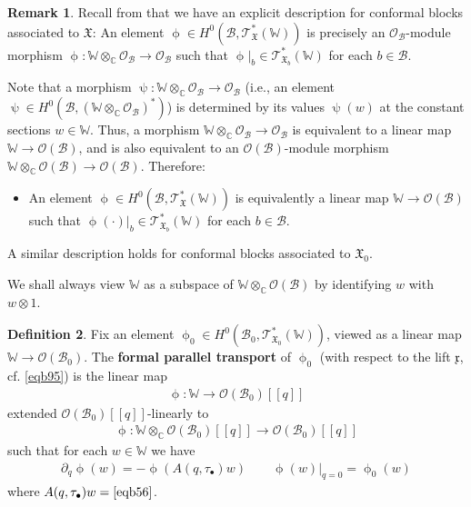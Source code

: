\documentclass[11pt,b5paper,notitlepage]{article}
\theoremstyle{definition}
\newtheorem{df}{Definition}[section]
\newtheorem{rem}[df]{Remark}
\theoremstyle{plain}
\newcommand{\mc}{\mathcal}
\newcommand{\scr}{\mathscr}
\newcommand{\xk}{\mathfrak x}
\newcommand{\blt}{\bullet}
\newcommand{\Wbb}{\mathbb W}
\newcommand{\Cbb}{\mathbb C}
\newcommand{\<}{\left\langle}
\renewcommand{\>}{\right\rangle}
\newcommand{\MB}{\mathcal{B}}
\newcommand{\fx}{\mathfrak{X}}
\newcommand{\ST}{\mathscr{T}}
\numberwithin{equation}{section}
\begin{document}
\begin{rem}\label{lbb27}
Recall from \cite[Prop. 2.21]{GZ1} that we have an explicit description for conformal blocks associated to $\fx$: An element $\upphi\in H^0(\MB,\scr T^*_\fx(\Wbb))$ is precisely an $\mc O_\MB$-module morphism $\upphi:\Wbb\otimes_\Cbb\mc O_\MB\rightarrow\mc O_\MB$ such that $\upphi|_b\in\scr T_{\fx_b}^*(\Wbb)$ for each $b\in\MB$. 

Note that a morphism $\uppsi:\Wbb\otimes_\Cbb\mc O_\MB\rightarrow\mc O_\MB$ (i.e., an element $\uppsi\in H^0(\MB,(\Wbb\otimes_\Cbb\mc O_\MB)^*)$) is determined by its values $\uppsi(w)$ at the constant sections $w\in\Wbb$. Thus, a morphism $\Wbb\otimes_\Cbb\mc O_\MB\rightarrow\mc O_\MB$ is equivalent to a linear map $\Wbb\rightarrow\mc O(\MB)$, and is also equivalent to an $\mc O(\MB)$-module morphism $\Wbb\otimes_\Cbb\mc O(\MB)\rightarrow \mc O(\MB)$. Therefore:
\begin{itemize}
\item An element $\upphi\in H^0(\MB,\scr T^*_\fx(\Wbb))$ is equivalently a linear map $\Wbb\rightarrow\mc O(\MB)$ such that $\upphi(\cdot)|_b\in\scr T_{\fx_b}^*(\Wbb)$ for each $b\in\MB$.
\end{itemize}
A similar description holds for conformal blocks associated to $\fx_0$. \hfill\qedsymbol
\end{rem}


We shall always view $\Wbb$ as a subspace of $\Wbb\otimes_\Cbb\mc O(\MB)$ by identifying $w$ with $w\otimes 1$.

\begin{df}\label{lbb31}
    Fix an element $\upphi_0\in H^0(\MB_0,\ST_{\fx_0}^*(\Wbb))$, viewed as a linear map $\Wbb\rightarrow\mc O(\MB_0)$. The \textbf{formal parallel transport} of $\upphi_0$ (with respect to the lift $\xk$, cf. \eqref{eqb95}) is the linear map 
    \begin{align*}
        \upphi:\Wbb\rightarrow \mc O(\MB_0)[[q]]
    \end{align*}
extended $\mc O(\MB_0)[[q]]$-linearly to 
   \begin{align}\label{eqb57}
        \upphi:\Wbb\otimes_\Cbb\mc O(\MB_0)[[q]]\rightarrow \mc O(\MB_0)[[q]]
    \end{align}
such that for each $w\in\Wbb$ we have 
\begin{align}\label{eqb53}
\partial_q \upphi(w)=-\upphi(A(q,\tau_\blt)w)\qquad \upphi(w)\big|_{q=0}=\upphi_0(w)
\end{align}
where $A(q,\tau_\blt)w=\eqref{eqb56}$.   
\end{df}
\end{document}
